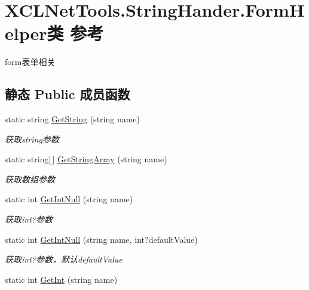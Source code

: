 \hypertarget{class_x_c_l_net_tools_1_1_string_hander_1_1_form_helper}{\section{X\-C\-L\-Net\-Tools.\-String\-Hander.\-Form\-Helper类 参考}
\label{class_x_c_l_net_tools_1_1_string_hander_1_1_form_helper}
}


form表单相关  


\subsection*{静态 Public 成员函数}
\begin{DoxyCompactItemize}
\item 
static string \hyperlink{class_x_c_l_net_tools_1_1_string_hander_1_1_form_helper_a8c34c5210ad29ea122ee8320b4f14f9f}{Get\-String} (string name)
\begin{DoxyCompactList}\small\item\em 获取string参数 \end{DoxyCompactList}\item 
static string\mbox{[}$\,$\mbox{]} \hyperlink{class_x_c_l_net_tools_1_1_string_hander_1_1_form_helper_a9b7680e6e7975889a62f273eaacdf37c}{Get\-String\-Array} (string name)
\begin{DoxyCompactList}\small\item\em 获取数组参数 \end{DoxyCompactList}\item 
static int \hyperlink{class_x_c_l_net_tools_1_1_string_hander_1_1_form_helper_a5f6d473bbc50e60cbd6c5015c1d4b010}{Get\-Int\-Null} (string name)
\begin{DoxyCompactList}\small\item\em 获取int?参数 \end{DoxyCompactList}\item 
static int \hyperlink{class_x_c_l_net_tools_1_1_string_hander_1_1_form_helper_a91af563c9654d78b004215b0d8cc5338}{Get\-Int\-Null} (string name, int?default\-Value)
\begin{DoxyCompactList}\small\item\em 获取int?参数，默认default\-Value \end{DoxyCompactList}\item 
static int \hyperlink{class_x_c_l_net_tools_1_1_string_hander_1_1_form_helper_ad3bcc9178dfa1bdc2d0e459b95d56fb4}{Get\-Int} (string name)

\end{DoxyCompactItemize}
